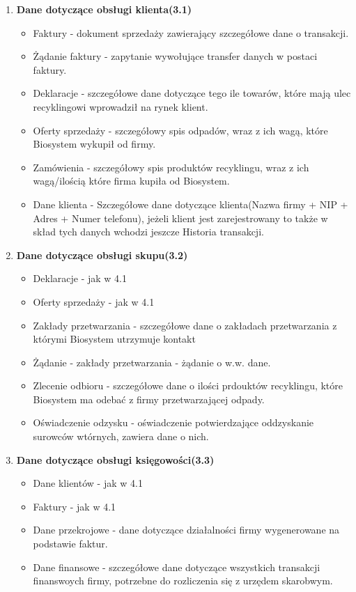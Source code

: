 \begin{enumerate}
\item \textbf{Dane dotyczące obsługi klienta(3.1)}
	\begin{itemize}
		\item Faktury - dokument sprzedaży zawierający szczegółowe dane o transakcji.
		\item Żądanie faktury - zapytanie wywołujące transfer danych w postaci faktury.
		\item Deklaracje - szczegółowe dane dotyczące tego ile towarów, które mają ulec recyklingowi wprowadził na rynek klient.
		\item Oferty sprzedaży - szczegółowy spis odpadów, wraz z ich wagą, które Biosystem wykupił od firmy.
		\item Zamówienia - szczegółowy spis produktów recyklingu, wraz z ich wagą/ilością które firma kupiła od Biosystem.
		\item Dane klienta - Szczegółowe dane dotyczące klienta(Nazwa firmy + NIP + Adres + Numer telefonu), jeżeli klient jest zarejestrowany to także w skład tych danych wchodzi jeszcze Historia transakcji.
	\end{itemize}
\item \textbf{Dane dotyczące obsługi skupu(3.2)}
	\begin{itemize}
		\item Deklaracje - jak w 4.1
		\item Oferty sprzedaży - jak w 4.1
		\item Zakłady przetwarzania - szczegółowe dane o zakładach przetwarzania z którymi Biosystem utrzymuje kontakt
		\item Żądanie - zakłady przetwarzania - żądanie o w.w. dane.
		\item Zlecenie odbioru - szczegółowe dane o ilości prdouktów recyklingu, które Biosystem ma odebać z firmy przetwarzającej odpady.
		\item Oświadczenie odzysku - oświadczenie potwierdzające oddzyskanie surowców wtórnych, zawiera dane o nich.
	\end{itemize}
\item \textbf{Dane dotyczące obsługi księgowości(3.3)}
	\begin{itemize}
		\item Dane klientów - jak w 4.1
		\item Faktury - jak w 4.1 
		\item Dane przekrojowe - dane dotyczące działalności firmy wygenerowane na podstawie faktur.
		\item Dane finansowe - szczegółowe dane dotyczące wszystkich transakcji finanswoych firmy, potrzebne do rozliczenia się z urzędem skarobwym.

\end{itemize}
\end{enumerate}
